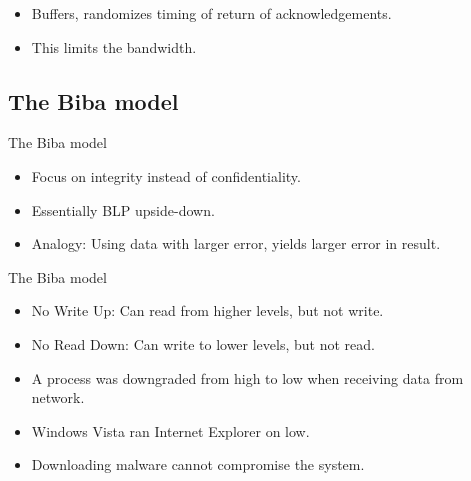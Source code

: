 \begin{frame}
  \begin{example}
    \begin{itemize}
      \item Buffers, randomizes timing of return of acknowledgements.
      \item This limits the bandwidth.
    \end{itemize}
  \end{example}
\end{frame}

\subsection{The Biba model}

\begin{frame}
  \begin{idea}{The Biba model}
    \begin{itemize}
      \item Focus on integrity instead of confidentiality.
      \item Essentially BLP upside-down.
      \item Analogy: Using data with larger error, yields larger error in 
        result.
    \end{itemize}
  \end{idea}
\end{frame}

\begin{frame}
  \begin{block}{The Biba model}
    \begin{itemize}
      \item No Write Up: Can read from higher levels, but not write.
      \item No Read Down: Can write to lower levels, but not read.
    \end{itemize}
  \end{block}

  \pause

  \begin{example}
    \begin{itemize}
      \item A process was downgraded from high to low when receiving data from 
        network.
    \end{itemize}
  \end{example}

  \pause

  \begin{example}
    \begin{itemize}
      \item Windows Vista ran Internet Explorer on low.
      \item Downloading malware cannot compromise the system.
    \end{itemize}
  \end{example}
\end{frame}



\begin{frame}[allowframebreaks]
  \printbibliography{}
\end{frame}

